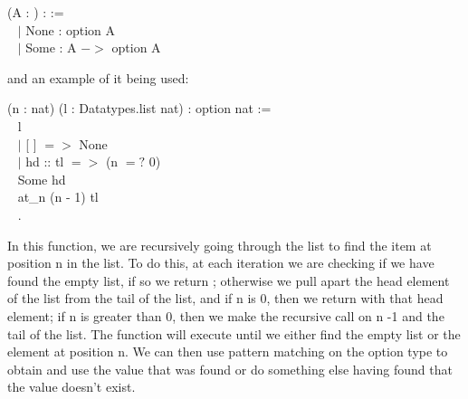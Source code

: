 \begin{code} 
	\Inductive {} (A : \Type) : \Type :=	\\ \-\ \quad
	$\mid$ None : option A					\\ \-\ \quad
	$\mid$ Some : A $->$ option A
\end{code}

and an example of it being used:

\begin{code}
	\Fixpoint {} (n : nat) (l : Datatypes.list nat) : option nat :=	\\ \-\ \quad
	  \match l \with 										\\ \-\ \qquad
	  $\mid$ [ ] $=>$ None								\\ \-\ \qquad
	  $\mid$ hd :: tl $=>$  \If (n $=?$ 0)			\\ \-\ \qquad\qquad\qquad\quad
		    \Then Some hd					\\ \-\ \qquad\qquad\qquad\quad
		    \Else at\_n (n - 1) tl							\\ \-\ \qquad
	  \End.
\end{code}

\noindent
In this function, we are recursively going through the list to find the item at position n in the list.
To do this, at each iteration we are checking if we have found the empty list, if so we return ; 
otherwise we pull apart the head element of the list from the tail of the list, and if n is 0, then we return  with that head element; 
if n is greater than 0, then we make the recursive call on n -1 and the tail of the list. 
The function will execute until we either find the empty list or the element at position n.
We can then use pattern matching on the option type to obtain and use the value that was found or do something else having found that the value doesn't exist.








